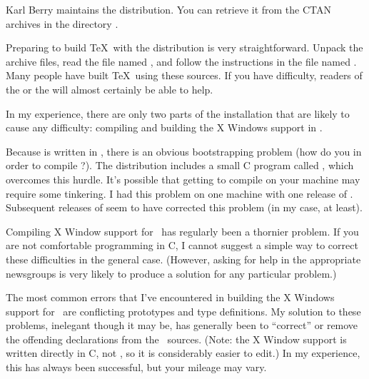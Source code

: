 Karl Berry maintains the 
 distribution.  You can retrieve it
from the CTAN archives in the directory .

Preparing to build \TeX\ with the  distribution is very
straightforward.  Unpack the archive files, read the file named ,
and follow the instructions in the file named .   Many people
have built \TeX\ using these sources.  If you have difficulty, readers of the 
 or the 
 will almost certainly be able to help.

In my experience, there are only two parts of the installation that are 
likely to cause any difficulty: compiling  and building
the X Windows support in \MF.

Because  is written in \web, there is an obvious
bootstrapping problem (how do you  
in order to compile ?).  The 
distribution includes a small C program called ,
which overcomes this hurdle.  It's possible that getting
 to compile on your machine may require some
tinkering.  I had this problem on one machine with one release of
.  Subsequent releases of  seem to have
corrected this problem (in my case, at least).

Compiling X Window support for \MF\ has regularly been a thornier problem.
If you are not comfortable programming in C, I cannot suggest a simple
way to correct these difficulties in the general case.  (However, asking for 
help in the 
appropriate newsgroups is very likely to produce a solution for any 
particular problem.)

The most common errors that I've encountered in building the X Windows support
for \MF\ are conflicting prototypes and type definitions.  My solution to 
these problems, inelegant though it may be, has generally been to ``correct''
or remove the offending declarations from the \MF\ sources. (Note: the X
Window support is written directly in C, not \web, so it is considerably
easier to edit.)  In my experience, this has always been successful, but your
mileage may vary.

\section{\protect\emTeX}

